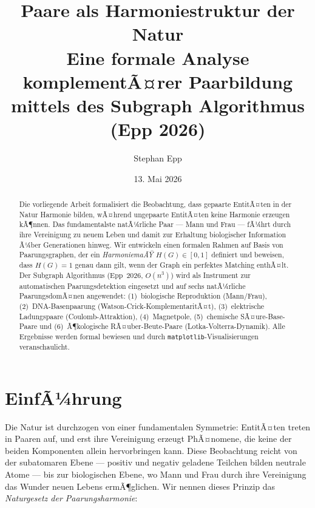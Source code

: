 ﻿\documentclass[a4paper,12pt]{article}
\title{\textbf{Paare als Harmoniestruktur der Natur}\\[0.4em]
\large Eine formale Analyse komplementÃ¤rer Paarbildung\\
mittels des Subgraph Algorithmus (Epp 2026)}
\author{Stephan Epp}
\date{13. Mai 2026}
\theoremstyle{definition}
\begin{document}
\maketitle
\begin{abstract}
Die vorliegende Arbeit formalisiert die Beobachtung, dass gepaarte EntitÃ¤ten in der Natur
Harmonie bilden, wÃ¤hrend ungepaarte EntitÃ¤ten keine Harmonie erzeugen kÃ¶nnen.
Das fundamentalste natÃ¼rliche Paar --- Mann und Frau --- fÃ¼hrt durch ihre Vereinigung zu
neuem Leben und damit zur Erhaltung biologischer Information Ã¼ber Generationen hinweg.
Wir entwickeln einen formalen Rahmen auf Basis von Paarungsgraphen, der ein
\emph{HarmoniemaÃŸ} $H(G) \in [0,1]$ definiert und beweisen, dass $H(G) = 1$ genau dann
gilt, wenn der Graph ein perfektes Matching enthÃ¤lt.
Der Subgraph Algorithmus (Epp~2026, $O(n^3)$) wird als Instrument zur automatischen
Paarungsdetektion eingesetzt und auf sechs natÃ¼rliche PaarungsdomÃ¤nen angewendet:
(1)~biologische Reproduktion (Mann/Frau), (2)~DNA-Basenpaarung (Watson-Crick-KomplementaritÃ¤t),
(3)~elektrische Ladungspaare (Coulomb-Attraktion), (4)~Magnetpole,
(5)~chemische SÃ¤ure-Base-Paare und (6)~Ã¶kologische RÃ¤uber-Beute-Paare
(Lotka-Volterra-Dynamik).
Alle Ergebnisse werden formal bewiesen und durch \texttt{matplotlib}-Visualisierungen
veranschaulicht.
\end{abstract}

\tableofcontents
\newpage

\section{EinfÃ¼hrung}

Die Natur ist durchzogen von einer fundamentalen Symmetrie: EntitÃ¤ten treten in Paaren
auf, und erst ihre Vereinigung erzeugt PhÃ¤nomene, die keine der beiden Komponenten allein
hervorbringen kann. Diese Beobachtung reicht von der subatomaren Ebene --- positiv und
negativ geladene Teilchen bilden neutrale Atome --- bis zur biologischen Ebene, wo Mann und
Frau durch ihre Vereinigung das Wunder neuen Lebens ermÃ¶glichen. Wir nennen dieses
Prinzip das \emph{Naturgesetz der Paarungsharmonie}:

\medskip
\centerline{}
\medskip
\end{document}
